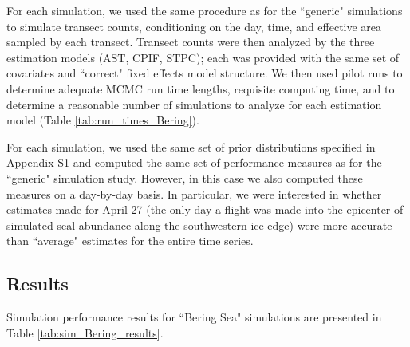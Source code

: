\documentclass[12pt,fleqn]{article}
\begin{document}
\begin{flushleft}
\hspace{.5in} For each simulation, we used the same procedure as for the ``generic" simulations to simulate transect counts, conditioning on the day, time, and effective area sampled by each transect.  Transect counts were then analyzed by the three estimation models (AST, CPIF, STPC); each was provided with the same set of covariates and ``correct" fixed effects model structure.  We then used pilot runs to determine adequate MCMC run time lengths, requisite computing time, and to determine a reasonable number of simulations to analyze for each estimation model (Table \ref{tab:run_times_Bering}).


\hspace{.5in} For each simulation, we used the same set of prior distributions specified in Appendix S1 and computed the same set of performance measures as for the ``generic" simulation study.  However, in this case we also computed these measures on a day-by-day basis.  In particular, we were interested in whether estimates made for April 27 (the only day a flight was made into the epicenter of simulated seal abundance along the southwestern ice edge) were more accurate than ``average" estimates for the entire time series.


\subsection{Results}

Simulation performance results for ``Bering Sea" simulations are presented in Table
\ref{tab:sim_Bering_results}.


\renewcommand{\refname}{Literature Cited}




\pagebreak


\end{flushleft}
\end{document}
